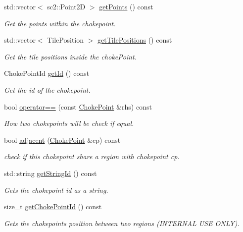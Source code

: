 \begin{DoxyCompactItemize}
std\+::vector$<$ sc2\+::\+Point2D $>$ \hyperlink{classOverseer_1_1ChokePoint_a753c9b428f2f0b7d3d0917824b1c644c}{get\+Points} () const
\begin{DoxyCompactList}\small\item\em Get the points within the chokepoint. \end{DoxyCompactList}\item 
std\+::vector$<$ Tile\+Position $>$ \hyperlink{classOverseer_1_1ChokePoint_adabe2718639f0ec4230719ba44474d1e}{get\+Tile\+Positions} () const
\begin{DoxyCompactList}\small\item\em Get the tile positions inside the choke\+Point. \end{DoxyCompactList}\item 
Choke\+Point\+Id \hyperlink{classOverseer_1_1ChokePoint_a65fcb2c27b473c0e93f97f4e0f60cfcd}{get\+Id} () const
\begin{DoxyCompactList}\small\item\em Get the id of the chokepoint. \end{DoxyCompactList}\item 
\mbox{\label{classOverseer_1_1ChokePoint_ac202362d2ba190d36a7a79fa8e857091}} 
bool \hyperlink{classOverseer_1_1ChokePoint_ac202362d2ba190d36a7a79fa8e857091}{operator==} (const \hyperlink{classOverseer_1_1ChokePoint}{Choke\+Point} \&rhs) const
\begin{DoxyCompactList}\small\item\em How two chokepoints will be check if equal. \end{DoxyCompactList}\item 
bool \hyperlink{classOverseer_1_1ChokePoint_a67dde2067e19bcfed9c24b1edc0e6e2c}{adjacent} (\hyperlink{classOverseer_1_1ChokePoint}{Choke\+Point} \&cp) const
\begin{DoxyCompactList}\small\item\em check if this chokepoint share a region with chokepoint cp. \end{DoxyCompactList}\item 
std\+::string \hyperlink{classOverseer_1_1ChokePoint_a5b80f5db4c702537d5298e473442054d}{get\+String\+Id} () const
\begin{DoxyCompactList}\small\item\em Gets the chokepoint id as a string. \end{DoxyCompactList}\item 
\mbox{\label{classOverseer_1_1ChokePoint_a0092e11310e9aa5502b43723faba41b9}} 
size\+\_\+t \hyperlink{classOverseer_1_1ChokePoint_a0092e11310e9aa5502b43723faba41b9}{get\+Choke\+Point\+Id} () const
\begin{DoxyCompactList}\small\item\em Gets the chokepoints position between two regions (I\+N\+T\+E\+R\+N\+AL U\+SE O\+N\+LY). \end{DoxyCompactList}\end{DoxyCompactItemize}


